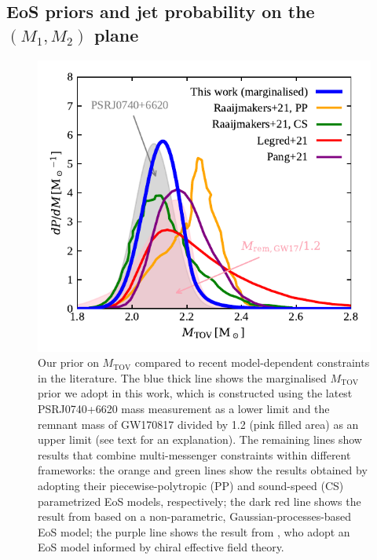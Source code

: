 \documentclass[]{aa}
\newcommand{\resp}[1]{#1}
\begin{document}
\subsection{EoS priors and jet probability on the $(M_1,M_2)$ plane}
\label{sec:EoS_priors}

\begin{figure}
 \centering
 \includegraphics[width=\columnwidth]{figures/MTOV_prior_comparison.pdf} 
 \caption{Our prior on $M_\mathrm{TOV}$ compared to recent model-dependent constraints in the literature. The blue thick line shows the \resp{marginalised} $M_\mathrm{TOV}$ prior we adopt in this work, which is constructed using the latest PSRJ0740+6620 mass measurement \citep[][grey filled area]{Fonseca2021} as a lower limit and the \resp{remnant} mass of GW170817 divided by 1.2 (pink filled area) as an upper limit (see text for an explanation). \resp{The remaining lines show results that combine multi-messenger constraints within different frameworks: the orange and green lines show the results obtained by \citet{Raaijmakers2021} adopting their piecewise-polytropic (PP) and sound-speed (CS) parametrized EoS models, respectively; the dark red line shows the result from \citet{Legred2021} based on a non-parametric, Gaussian-processes-based EoS model; the purple line shows the result from \citet{Pang2021}, who adopt an EoS model informed by chiral effective field theory.}}
  \label{fig:MTOV_prior}
\end{figure}
\end{document}
